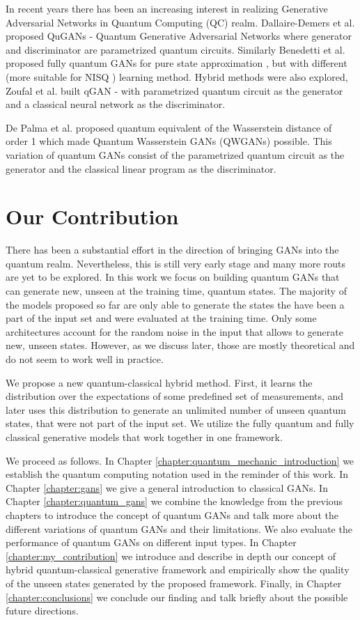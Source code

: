 In recent years there has been an increasing interest in realizing Generative
Adversarial Networks in Quantum Computing (QC) realm. Dallaire-Demers et al.
proposed QuGANs \cite{Dallaire_Demers_2018} - Quantum Generative Adversarial Networks
where generator and discriminator are parametrized quantum circuits. Similarly
Benedetti et al. proposed fully quantum GANs for pure state approximation \cite{Benedetti_2019}, but
with different (more suitable for NISQ \cite{Preskill_2018}) learning method.
Hybrid methods were also explored, Zoufal et al. built qGAN \cite{Zoufal_2019} -
with parametrized quantum circuit as the generator and a classical neural network
as the discriminator. 

De Palma et al. proposed quantum equivalent of the Wasserstein distance of order 1
\cite{depalma2020quantum} which made Quantum Wasserstein GANs
(QWGANs) \cite{kiani2021quantum} possible. This variation of quantum GANs
consist of the parametrized quantum circuit as the generator and the classical linear
program as the discriminator.

\section{Our Contribution}
There has been a substantial effort in the direction of bringing GANs into the quantum
realm. Nevertheless, this is still very early stage and many more routs are yet
to be explored. In this work we focus on building quantum GANs that can generate
new, unseen at the training time, quantum states. The majority of the models
proposed so far are only able to generate the states the have 
been a part of the input set and were evaluated at the training time. Only some 
architectures \cite{Dallaire_Demers_2018} account for the random noise in the input
that allows to generate new, unseen states. However, as we discuss later, those are
mostly theoretical and do not seem to work well in practice.


We propose a new quantum-classical hybrid method. First, it learns the
distribution over the expectations of some predefined set of measurements, and later uses this
distribution to generate an unlimited number of unseen quantum states, that were not part of the input
set. We utilize the fully quantum and fully classical generative models that
work together in one framework. 

We proceed as follows. In Chapter \ref{chapter:quantum_mechanic_introduction} we
establish the quantum computing notation used in the reminder of this work. In
Chapter \ref{chapter:gans} we give a general introduction to classical GANs. In
Chapter \ref{chapter:quantum_gans} we combine the knowledge from the previous
chapters to introduce the concept of quantum GANs and talk more about the
different variations of quantum GANs and their limitations. We also evaluate the
performance of quantum GANs on different input types. In Chapter
\ref{chapter:my_contribution} we introduce and describe in depth our
concept of hybrid quantum-classical generative framework and empirically show the
quality of the unseen states generated by the proposed framework. Finally, in Chapter
\ref{chapter:conclusions} we conclude our finding and talk briefly about the
possible future directions. 

